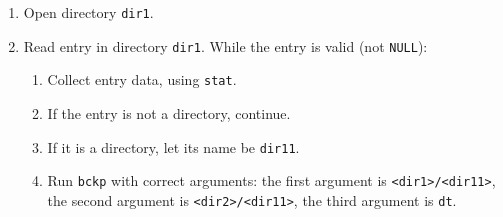 \documentclass{sope}
\begin{document}
\begin{enumerate}[label=3.\arabic*]
    \item Open directory \texttt{dir1}.
    \item Read entry in directory \texttt{dir1}. While the entry is valid (not \texttt{NULL}):
    \begin{enumerate}[label*=.\arabic*]
        \item Collect entry data, using \texttt{stat}.
        \item If the entry is not a directory, continue.
        \item If it is a directory, let its name be \texttt{dir11}.
        \item Run \texttt{bckp} with correct arguments: the first argument is \texttt{<dir1>/<dir11>}, the second argument is \texttt{<dir2>/<dir11>}, the third argument is \texttt{dt}.
    \end{enumerate}
\end{enumerate}

\newpage
{}

\end{document}
